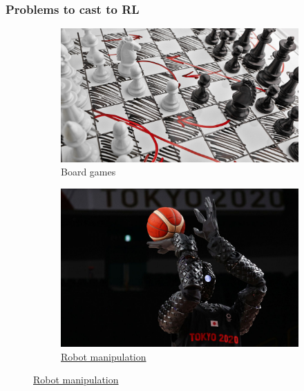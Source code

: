 \documentclass[10pt]{beamer}
\theoremstyle{remark}
\begin{document}
\begin{frame}
    \frametitle{Problems to cast to RL}
    \begin{figure}[h]
        \begin{subfigure}[t]{0.4\textwidth}
            \includegraphics[width=\textwidth]{figures/motivation1.png}
            \caption{Board games}
        \end{subfigure}
        \begin{subfigure}[t]{0.4\textwidth}
            \includegraphics[width=\textwidth]{figures/motivation2.jpg}
            \caption{\href{https://www.youtube.com/watch?v=KH9m0L7F-sE}{Robot manipulation}}
        \end{subfigure}


\end{figure}
\end{frame}
\end{document}
